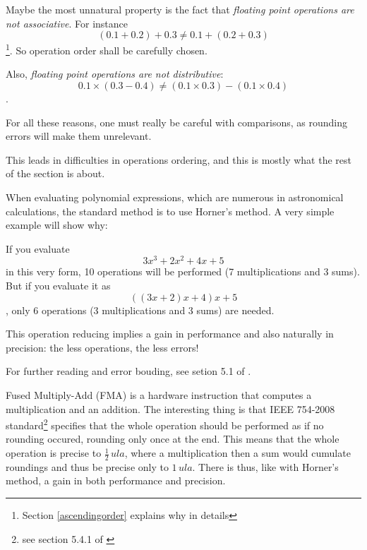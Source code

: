 Maybe the most unnatural property is the fact that \emph{floating point operations are not associative}. For instance $$(0.1 + 0.2) + 0.3 \neq 0.1 + (0.2 + 0.3)$$\footnote{Section \ref{ascendingorder} explains why in details}. So operation order shall be carefully chosen.

Also, \emph{floating point operations are not distributive}: $$0.1 \times (0.3 - 0.4) \neq (0.1 \times 0.3) - (0.1 \times 0.4)$$.

For all these reasons, one must really be careful with comparisons, as rounding errors will make them unrelevant.

This leads in difficulties in operations ordering, and this is mostly what the rest of the section is about.

\label{polynomials}

When evaluating polynomial expressions, which are numerous in astronomical calculations, the standard method is to use Horner's method. A very simple example will show why:

If you evaluate $$3x^3 + 2x^2 + 4x + 5$$ in this very form, 10 operations will be performed (7 multiplications and 3 sums). But if you evaluate it as $$((3x + 2)x + 4)x + 5$$, only 6 operations (3 multiplications and 3 sums) are needed.

This operation reducing implies a gain in performance and also naturally in precision: the less operations, the less errors!

For further reading and error bouding, see setion 5.1 of \cite{Higham}.

\label{fma}


Fused Multiply-Add (FMA) is a hardware instruction that computes a multiplication and an addition. The interesting thing is that IEEE 754-2008 standard\footnote{see section 5.4.1 of \cite{IEEE754}} specifies that the whole operation should be performed as if no rounding occured, rounding only once at the end. This means that the whole operation is precise to $\frac{1}{2}\,ula$, where a multiplication then a sum would cumulate roundings and thus be precise only to $1\,ula$. There is thus, like with Horner's method, a gain in both performance and precision.


